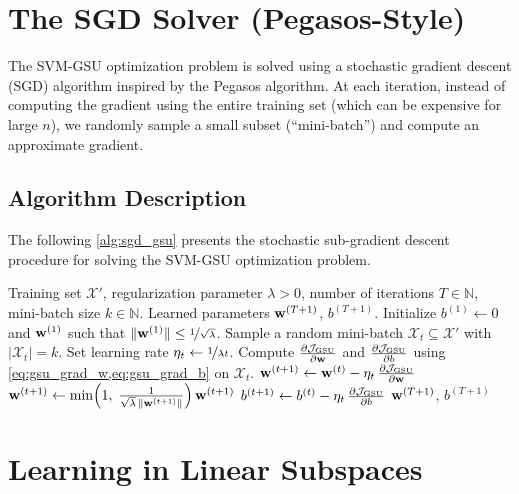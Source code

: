 \documentclass[11pt, letterpaper]{article}
\newcommand{\setX}{\mathcal{X}}
\newcommand{\obj}{\mathcal{J}}
\begin{document}
\section{The SGD Solver (Pegasos-Style)}\label{sec:sgd_solver}

The SVM-GSU optimization problem is solved using a stochastic gradient descent (SGD) algorithm inspired by the Pegasos algorithm. At each iteration, instead of computing the gradient using the entire training set (which can be expensive for large $n$), we randomly sample a small subset (``mini-batch'') and compute an approximate gradient.

\subsection{Algorithm Description}

The following \cref{alg:sgd_gsu} presents the stochastic sub-gradient descent procedure for solving the SVM-GSU optimization problem.

\begin{algorithm}[H]
\caption{Stochastic sub-gradient descent for SVM-GSU (Pegasos-style).}
\label{alg:sgd_gsu}
\begin{algorithmic}[1]
\Require Training set $\setX'$, regularization parameter $\lambda > 0$, number of iterations $T \in \mathbb{N}$, mini-batch size $k \in \mathbb{N}$.
\Ensure Learned parameters $\vb{w}^{(T+1)}$, $b^{(T+1)}$.
\State Initialize $b^{(1)} \gets 0$ and $\vb{w}^{(1)}$ such that $\|\vb{w}^{(1)}\| \leq \nicefrac{1}{\sqrt{\lambda}}$.
    \State Sample a random mini-batch $\setX_t \subseteq \setX'$ with $|\setX_t| = k$.
    \State Set learning rate $\eta_t \gets \nicefrac{1}{\lambda t}$.
    \State Compute $\pdv{\obj_{\text{GSU}}}{\vb{w}}$ and $\pdv{\obj_{\text{GSU}}}{b}$ using \cref{eq:gsu_grad_w,eq:gsu_grad_b} on $\setX_t$.
    \State $\vb{w}^{(t+1)} \gets \vb{w}^{(t)} - \eta_t\, \pdv{\obj_{\text{GSU}}}{\vb{w}}$ 
    \State $\vb{w}^{(t+1)} \gets \min\!\left(1,\; \frac{1}{\sqrt{\lambda}\,\|\vb{w}^{(t+1)}\|}\right) \vb{w}^{(t+1)}$ 
    \State $b^{(t+1)} \gets b^{(t)} - \eta_t\, \pdv{\obj_{\text{GSU}}}{b}$ 
\EndFor
\State \Return $\vb{w}^{(T+1)}$, $b^{(T+1)}$
\end{algorithmic}
\end{algorithm}

\section{Learning in Linear Subspaces}\label{sec:subspace}
\end{document}
